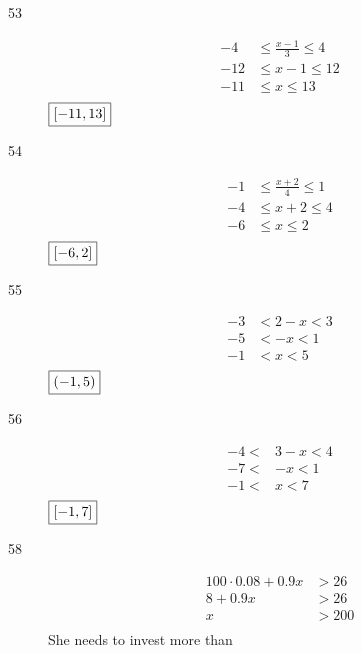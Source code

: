 \documentclass[letterpaper, landscape]{exam}
\begin{document}
\begin{description}
      \newpage

      \item[53]
        \begin{align*}
          -4  & \leq \frac{x - 1}{3} \leq 4 \\
          -12 & \leq x - 1           \leq 12 \\
          -11 & \leq x               \leq 13 \\
        \end{align*}
        $\boxed{ \intcc{ -11, 13 } }$

      \item[54]
        \begin{align*}
          -1 & \leq \frac{x + 2}{4} \leq 1 \\
          -4 & \leq x + 2 \leq 4 \\
          -6 & \leq x \leq 2 \\
        \end{align*}
        $\boxed{ \intcc{ -6, 2 } }$

      \item[55]
        \begin{align*}
          -3 & < 2 - x < 3 \\
          -5 & < - x < 1 \\
          -1 & < x < 5 \\
        \end{align*}
        $\boxed{ \intoo{ -1, 5 } }$

      \item[56]
        \begin{align*}
          -4 < & 3 - x < 4 \\
          -7 < & -x    < 1 \\
          -1 < & x     < 7 \\
        \end{align*}
        $\boxed{ \intcc{ -1, 7 } }$

      \item[58]
        \begin{align*}
          100 \cdot 0.08 + 0.9x & > 26 \\
          8 + 0.9x              & > 26 \\
          x                     & > 200 \\
        \end{align*}
        She needs to invest more than 


\end{description}
\end{document}
